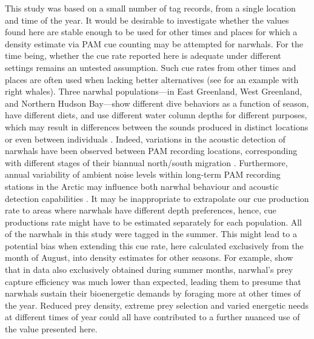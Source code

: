 \documentclass[preprint]{JASA}
\begin{document}
This study was based on a small number of tag records, from a single location and time of the year. It would be desirable to investigate whether the values found here are stable enough to be used for other times and places for which a density estimate via PAM cue counting may be attempted for narwhals. For the time being, whether the cue rate reported here is adequate under different settings remains an untested assumption. Such cue rates from other times and places are often used when lacking better alternatives (see \citep[e.g.][]{Marques_2011} for an example with right whales). Three narwhal populations—in East Greenland, West Greenland, and Northern Hudson Bay—show different dive behaviors as a function of season, have different diets, and use different water column depths for different purposes, which may result in  differences between the sounds produced in distinct locations  or even between individuals \citep{marcoux2012, Watt_2015}. Indeed, variations in the acoustic detection of narwhals have been observed  between PAM recording locations, corresponding with different stages of their biannual north/south migration \citep{frouin2017seasonal}. Furthermore, annual variability of ambient noise levels within long-term PAM recording stations in the Arctic may influence both narwhal behaviour and acoustic detection capabilities \citep{ladegaard2021soundscape}. It may be inappropriate to extrapolate our cue production rate to areas where narwhals have different depth preferences, hence, cue productions rate might have to be estimated separately for each population. All of the narwhals in this study were tagged in the summer. This might lead to a potential bias when extending this cue rate, here calculated exclusively from the month of August, into density estimates for other seasons. For example, \citet{Chambault2023} show that in data also exclusively obtained during summer months,  narwhal's prey capture efficiency was much lower than expected, leading them to presume that narwhals sustain their bioenergetic demands by foraging more at other times of the year. Reduced prey density, extreme prey selection and varied energetic needs at different times of year could all have contributed to a further nuanced use of the value presented here.
\end{document}
